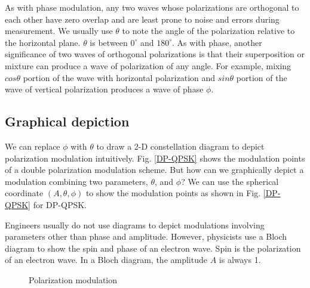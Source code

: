 \documentclass[oneside, letter, 12pt]{book}
\begin{document}
As with phase modulation, any two waves whose polarizations are orthogonal to each other have zero overlap and are least prone to noise and errors during measurement. We usually use $\theta$ to note the angle of the polarization relative to the horizontal plane. $\theta$ is between $0^\circ$ and $180^\circ$. As with phase, another significance of two waves of orthogonal polarizations is that their superposition or mixture can produce a wave of polarization of any angle. For example, mixing $cos\theta$ portion of the wave with horizontal polarization and $sin\theta$ portion of the wave of vertical polarization produces a wave of phase $\phi$. 

\subsection{Graphical depiction}
We can replace $\phi$ with $\theta$ to draw a 2-D constellation diagram to depict polarization modulation intuitively. Fig. \ref{DP-QPSK} shows the modulation points of a double polarization modulation scheme. But how can we graphically depict a modulation combining two parameters, $\theta$, and $\phi$? We can use the spherical coordinate $(A, \theta, \phi)$ to show the modulation points as shown in Fig. \ref{DP-QPSK} for DP-QPSK.

Engineers usually do not use diagrams to depict modulations involving parameters other than phase and amplitude. However, physicists use a Bloch diagram to show the spin and phase of an electron wave. Spin is the polarization of an electron wave. In a Bloch diagram, the amplitude $A$ is always 1.

\begin{figure}[h]
\caption{Polarization modulation}
\label{PolarM}
\end{figure}
\end{document}
